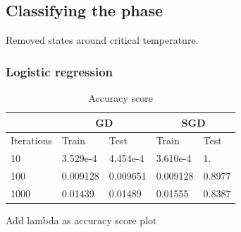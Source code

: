 \subsection{Classifying the phase}
Removed states around critical temperature.

\subsubsection{Logistic regression}
\begin{table} [H]
	\caption{Accuracy score}
	\begin{tabularx}{\textwidth}{l|XX|XX} \hline\hline
		\label{tab:logistic_regression}
		& \multicolumn{2}{c}{\textbf{GD}}&\multicolumn{2}{c}{\textbf{SGD}}\\ \hline
		Iterations&Train&Test&Train&Test\\ \hline
		10 & 3.529e-4 & 4.454e-4 & 3.610e-4 & 1.\\
		100 & 0.009128 & 0.009651 & 0.009128 & 0.8977 \\
		1000 & 0.01439 & 0.01489 & 0.01555 & 0.8387 \\ \hline\hline
	\end{tabularx}
\end{table}

Add lambda as accuracy score plot

